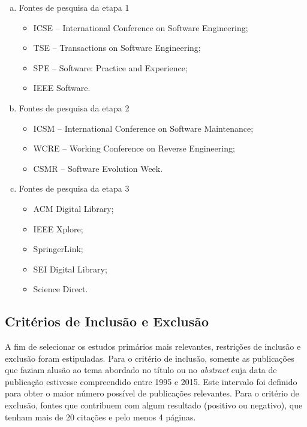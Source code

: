 \begin{enumerate}[(a)]

\item Fontes de pesquisa da etapa 1
  \begin{itemize}
   \item{ICSE -- International Conference on Software Engineering;}
   \item{TSE -- Transactions on Software Engineering;}
   \item{SPE -- Software: Practice and Experience;}
   \item{IEEE Software.} 
  \end{itemize}

\item Fontes de pesquisa da etapa 2

  \begin{itemize}
   \item{ICSM -- International Conference on Software Maintenance;}
   \item{WCRE -- Working Conference on Reverse Engineering;}
   \item{CSMR -- Software Evolution Week.} 
  \end{itemize}

\item Fontes de pesquisa da etapa 3

  \begin{itemize}
   \item{ACM Digital Library;}
   \item{IEEE Xplore;}
   \item{SpringerLink;}
   \item{SEI Digital Library;} 
   \item{Science Direct.}
  \end{itemize}

\end{enumerate}

\subsection{Critérios de Inclusão e Exclusão}

A fim de selecionar os estudos primários mais relevantes, restrições de inclusão e exclusão foram estipuladas. 
Para o critério de inclusão, somente as publicações que faziam alusão ao tema abordado no título ou no \textit{abstract} 
cuja data de publicação estivesse compreendido entre 1995 e 2015. 
Este intervalo foi definido para obter o maior número possível de publicações relevantes. 
Para o critério de exclusão, fontes que contribuem com algum resultado (positivo ou negativo), 
que tenham mais de 20 citações e pelo menos 4 páginas.

